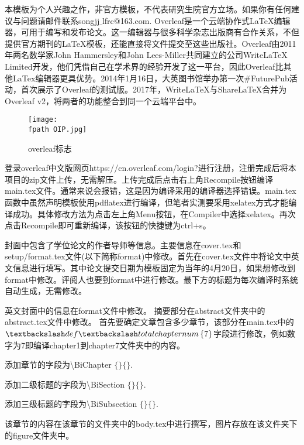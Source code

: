 
本模板为个人兴趣之作，非官方模板，不代表研究生院官方立场。如果你有任何建议与问题请邮件联系songjj$\_$lfrc@163.com.
\label{sec1.1}
Overleaf是一个云端协作式LaTeX编辑器，可用于编写和发布论文。这一编辑器与很多科学杂志出版商有合作关系，不但提供官方期刊的LaTeX模板，还能直接将文件提交至这些出版社。Overleaf由2011年两名数学家John Hammersley和John Lees-Miller共同建立的公司WriteLaTeX Limited开发，他们凭借自己在学术界的经验开发了这一平台，因此Overleaf比其他LaTex编辑器更具优势。2014年1月16日，大英图书馆举办第一次#FuturePub活动，首次展示了Overleaf的测试版。2017年，WriteLaTeX与ShareLaTeX合并为Overleaf v2，将两者的功能整合到同一个云端平台中。
\begin{figure}[htbp]
\centering
\texttt{[image: \\fpath OIP.jpg]}
\caption{overleaf标志}
\label{fig:0}
\vspace{-1em}
\end{figure}

登录overleaf中文版网页https://cn.overleaf.com/login?进行注册，注册完成后将本项目的zip文件上传，无需解压。上传完成后点击右上角Recompile按钮编译main.tex文件。通常来说会报错，这是因为编译采用的编译器选择错误。main.tex函数中虽然声明模板使用pdflatex进行编译，但笔者实测要采用xelatex方式才能编译成功。具体修改方法为点击左上角Menu按钮，在Compiler中选择xelatex。再次点击Recompile即可重新编译，该按钮的快捷键为ctrl+s。

封面中包含了学位论文的作者导师等信息。主要信息在cover.tex和setup/format.tex文件(以下简称format)中修改。首先在cover.tex文件中将论文中英文信息进行填写。其中论文提交日期为模板固定为当年的4月20日，如果想修改到format中修改。评阅人也要到format中进行修改。最下方的标题为每次编译时系统自动生成，无需修改。

英文封面中的信息在format文件中修改。
摘要部分在abstract文件夹中的abstract.tex文件中修改。
首先要确定文章包含多少章节，该部分在main.tex中的$\textbackslash def \textbackslash totalchapternum \left\{7\right\}$字段进行修改，例如数字为7即编译chapter1到chapter7文件夹中的内容。

添加章节的字段为\textbackslash BiChapter $\{$$\}$$\{$$\}$.

添加二级标题的字段为\textbackslash BiSection $\{$$\}$$\{$$\}$.

添加三级标题的字段为\textbackslash BiSubsection $\{$$\}$$\{$$\}$.

该章节的内容在该章节的文件夹中的body.tex中进行撰写，图片存放在该文件夹下的figure文件夹中。

